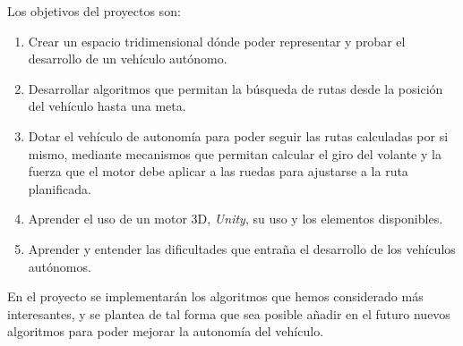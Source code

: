 Los objetivos del proyectos son:

\begin{enumerate}
\item Crear un espacio tridimensional dónde poder representar y probar el desarrollo de un vehículo autónomo.
\item Desarrollar algoritmos que permitan la búsqueda de rutas desde la posición del vehículo hasta una meta.
\item Dotar el vehículo de autonomía para poder seguir las rutas calculadas por si mismo, mediante mecanismos que permitan calcular el giro del volante y la fuerza que el motor debe aplicar a las ruedas para ajustarse a la ruta planificada.
\item Aprender el uso de un motor 3D, \textit{Unity}, su uso y los elementos disponibles.
\item Aprender y entender las dificultades que entraña el desarrollo de los vehículos autónomos.
\end{enumerate}

En el proyecto se implementarán los algoritmos que hemos considerado más interesantes, y se plantea de tal forma que sea posible añadir en el futuro nuevos algoritmos para poder mejorar la autonomía del vehículo.
